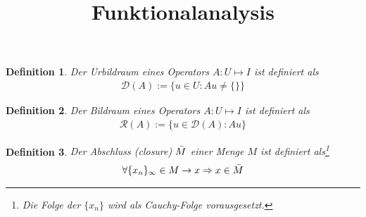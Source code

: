 \documentclass[size=12pt]{report}
\title{Funktionalanalysis}
\newtheorem{definition}{Definition}
\begin{document}
\begin{definition}
    Der Urbildraum eines Operators $A:U\mapsto I$ ist definiert als
    \begin{align*}
        \mathscr{D}(A):= \{u\in U: Au\neq \{\}\}
    \end{align*}
\end{definition}

\begin{definition}
    Der Bildraum eines Operators $A:U\mapsto I$ ist definiert als 
    \begin{align*}
        \mathscr{R}(A):= \{u\in \mathscr{D}(A): Au\}
    \end{align*}
\end{definition}

\begin{definition}
    Der Abschluss (closure) $\Bar{M}$ einer Menge $M$ ist definiert als\footnote{Die Folge der $\{x_n\}$ wird als Cauchy-Folge vorausgesetzt.}
    \begin{align*}
        \forall \{x_n\}_{\infty} \in M \rightarrow x \Rightarrow x\in \Bar{M}
    \end{align*}
\end{definition}
\end{document}
